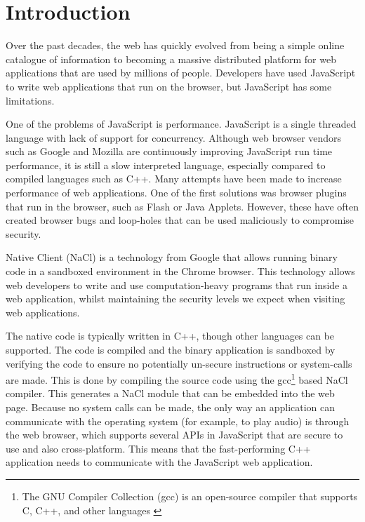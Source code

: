 \chapter{Introduction} 

\label{Chapter1}

Over the past decades, the web has quickly evolved from being a simple online catalogue of information to becoming a massive distributed platform for web applications that are used by millions of people. Developers have used JavaScript to write web applications that run on the browser, but JavaScript has some limitations. 

One of the problems of JavaScript is performance. JavaScript is a single threaded language with lack of support for concurrency. Although web browser vendors such as Google and Mozilla are continuously improving JavaScript run time performance, it is still a slow interpreted language, especially compared to compiled languages such as C++. Many attempts have been made to increase performance of web applications. One of the first solutions was browser plugins that run in the browser, such as Flash or Java Applets. However, these have often created browser bugs and loop-holes that can be used maliciously to compromise security.

Native Client \cite{nacl} (NaCl) is a technology from Google that allows running binary code in a sandboxed environment in the Chrome browser. This technology allows web developers to write and use computation-heavy programs that run inside a web application, whilst maintaining the security levels we expect when visiting web applications.

The native code is typically written in C++, though other languages can be supported. The code is compiled and the binary application is sandboxed by verifying the code to ensure no potentially un-secure instructions or system-calls are made. This is done by compiling the source code using the gcc\footnote{The GNU Compiler Collection (gcc) is an open-source compiler that supports C, C++, and other languages \cite{gcc}} based NaCl compiler. This generates a NaCl module that can be embedded into the web page. Because no system calls can be made, the only way an application can communicate with the operating system (for example, to play audio) is through the web browser, which supports several APIs in JavaScript that are secure to use and also cross-platform. This means that the fast-performing C++ application needs to communicate with the JavaScript web application.

